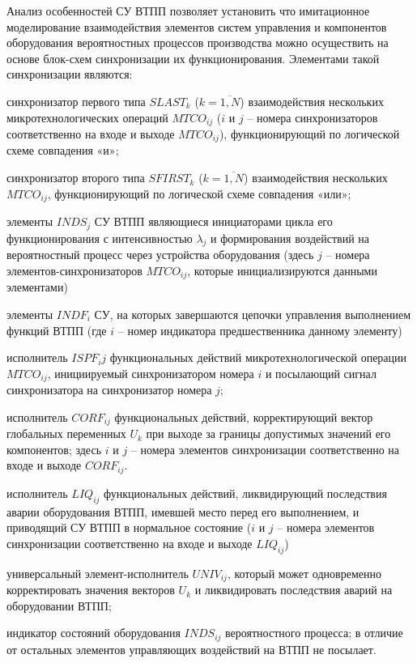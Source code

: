 Анализ особенностей СУ ВТПП позволяет установить что имитационное моделирование взаимодействия элементов систем управления и компонентов оборудования вероятностных процессов производства можно осуществить на основе блок-схем синхронизации их функционирования. Элементами такой синхронизации являются:
\begin{textitemize}
    \item синхронизатор первого типа $SLAST_k$ ($k= \overline{1,N} $) взаимодействия нескольких микротехнологических операций $MTCO_{ij}$ ($i$ и $j$ – номера синхронизаторов соответственно на входе и выходе $MTCO_{ij}$), функционирующий по логической схеме совпадения «и»;
    \item синхронизатор второго типа $SFIRST_k$ ($k= \overline{1,N} $) взаимодействия нескольких $MTCO_{ij}$, функционирующий по логической схеме совпадения «или»;
    \item элементы $INDS_j$ СУ ВТПП являющиеся инициаторами цикла его функционирования с интенсивностью $\lambda_j$ и формирования воздействий на вероятностный процесс через устройства оборудования (здесь $j$ – номера элементов-синхронизаторов $MTCO_{ij}$, которые инициализируются данными элементами)
    \item элементы $INDF_i$ СУ, на которых завершаются цепочки управления выполнением функций ВТПП (где $i$ – номер индикатора предшественника данному элементу)
    \item исполнитель $ISPF_ij$ функциональных действий микротехнологической операции  $MTCO_{ij}$, инициируемый синхронизатором номера $i$ и посылающий сигнал синхронизатора на синхронизатор номера $j$;
    \item исполнитель $CORF_{ij}$ функциональных действий, корректирующий вектор глобальных переменных $U_k$ при выходе за границы допустимых значений его компонентов; здесь $i$ и $j$ – номера элементов синхронизации соответственно на входе и выходе $CORF_{ij}$.
    \item исполнитель $LIQ_{ij}$ функциональных действий, ликвидирующий последствия аварии оборудования ВТПП, имевшей место перед его выполнением, и приводящий СУ ВТПП в нормальное состояние ($i$ и $j$ – номера элементов синхронизации соответственно на входе и выходе $LIQ_{ij}$)
    \item универсальный элемент-исполнитель $UNIV_{ij}$, который может одновременно корректировать значения векторов $U_k$ и ликвидировать последствия аварий на оборудовании ВТПП;
    \item индикатор состояний оборудования $INDS_{ij}$ вероятностного процесса; в отличие от остальных элементов управляющих воздействий на ВТПП не посылает.
\end{textitemize}


